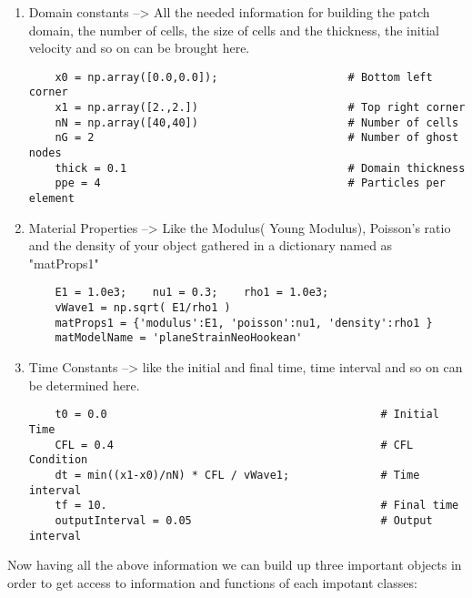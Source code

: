 \begin{enumerate}

\item Domain constants --> All the needed information for building the patch domain, the number of cells, the size of cells and the thickness, the initial velocity and so on can be brought here.

\begin{lstlisting}
    x0 = np.array([0.0,0.0]);                    # Bottom left corner
    x1 = np.array([2.,2.])                       # Top right corner
    nN = np.array([40,40])                       # Number of cells
    nG = 2                                       # Number of ghost nodes
    thick = 0.1                                  # Domain thickness
    ppe = 4                                      # Particles per element
\end{lstlisting}


\item Material Properties --> Like the Modulus( Young Modulus), Poisson's ratio and the density of your object gathered in a dictionary named as "matProps1"
\begin{lstlisting}
    E1 = 1.0e3;    nu1 = 0.3;    rho1 = 1.0e3;    
    vWave1 = np.sqrt( E1/rho1 )
    matProps1 = {'modulus':E1, 'poisson':nu1, 'density':rho1 }
    matModelName = 'planeStrainNeoHookean'
\end{lstlisting}

\item Time Constants --> like the initial and final time, time interval and so on can be determined here.
\begin{lstlisting}
    t0 = 0.0                                          # Initial Time
    CFL = 0.4                                         # CFL Condition
    dt = min((x1-x0)/nN) * CFL / vWave1;              # Time interval
    tf = 10.                                          # Final time
    outputInterval = 0.05                             # Output interval
\end{lstlisting}

\end{enumerate}


Now having all the above information we can build up three important objects in order to get access to information and functions of each impotant classes:

